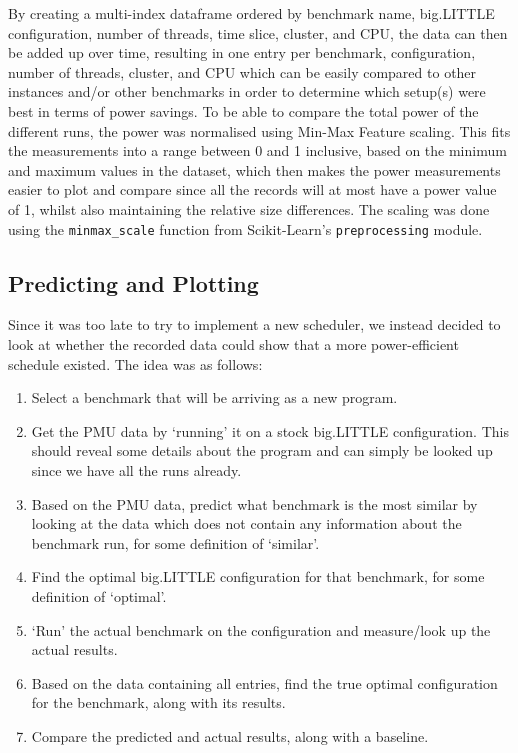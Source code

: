     By creating a multi-index dataframe ordered by benchmark name, big.LITTLE 
    configuration, number of threads, time slice, cluster, and CPU, the data 
    can then be added up over time, resulting in one entry per benchmark, 
    configuration, number of threads, cluster, and CPU which can be easily 
    compared to other instances and/or other benchmarks in order to determine 
    which setup(s) were best in terms of power savings. To be able to compare 
    the total power of the different runs, the power was normalised using 
    Min-Max Feature scaling. This fits the measurements into a range between 0 
    and 1 inclusive, based on the minimum and maximum values in the dataset, 
    which then makes the power measurements easier to plot and compare since 
    all the records will at most have a power value of 1, whilst also 
    maintaining the relative size differences. The scaling was done using the 
    \texttt{minmax\_scale} function from Scikit-Learn's 
    \cite{pedregosa_scikit-learn_2011} \texttt{preprocessing} module.
    
    \subsection{Predicting and Plotting}
    Since it was too late to try to implement a new scheduler, we instead 
    decided to look at whether the recorded data could show that a more 
    power-efficient schedule existed. The idea was as follows:
    \begin{enumerate}
        \item Select a benchmark that will be arriving as a new program.
        \item Get the PMU data by `running' it on a stock big.LITTLE
              configuration. This should reveal some details about the program
              and can simply be looked up since we have all the runs already.
        \item Based on the PMU data, predict what benchmark is the most similar
              by looking at the data which does not contain any information 
              about the benchmark run, for some definition of `similar'.
        \item Find the optimal big.LITTLE configuration for that benchmark, for
              some definition of `optimal'.
        \item `Run' the actual benchmark on the configuration and measure/look
              up the actual results.
        \item Based on the data containing all entries, find the true optimal
              configuration for the benchmark, along with its results.
        \item Compare the predicted and actual results, along with a baseline.
    \end{enumerate}

